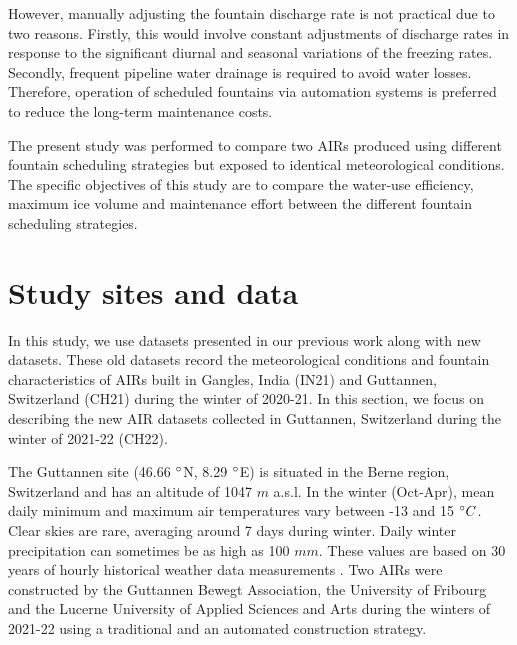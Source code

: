 \documentclass[tc, manuscript]{copernicus}
\begin{document}
However, manually adjusting the fountain discharge rate is not practical due to two reasons. Firstly, this would
involve constant adjustments of discharge rates in response to the significant diurnal and seasonal variations
of the freezing rates. Secondly, frequent pipeline water drainage is required to avoid water losses. Therefore,
operation of scheduled fountains via automation systems is preferred to reduce the long-term maintenance costs.

The present study was performed to compare two AIRs produced using different fountain scheduling strategies but
exposed to identical meteorological conditions. The specific objectives of this study are to compare the
water-use efficiency, maximum ice volume and maintenance effort between the different fountain scheduling strategies.

\section{Study sites and data}

In this study, we use datasets presented in our previous work
\citep{balasubramanianInfluenceMeteorologicalConditions2022} along with new datasets. These old datasets record
the meteorological conditions and fountain characteristics of AIRs built in Gangles, India (IN21) and Guttannen,
Switzerland (CH21) during the winter of 2020-21. In this section, we focus on describing the new AIR datasets
collected in Guttannen, Switzerland during the winter of 2021-22 (CH22).

The Guttannen site (46.66 $^{\circ}$N, 8.29 $^{\circ}$E) is situated in the Berne region, Switzerland and has an
altitude of 1047 $m$ a.s.l. In the winter (Oct-Apr), mean daily minimum and maximum air temperatures vary
between -13 and 15 $^{\circ} C$. Clear skies are rare, averaging around 7 days during winter. Daily winter
precipitation can sometimes be as high as 100 $mm$. These values are based on 30 years of hourly historical
weather data measurements \citep{meteoblueClimateGuttannen2021}. Two AIRs were constructed by the Guttannen
Bewegt Association, the University of Fribourg and the Lucerne University of Applied Sciences and Arts during
the winters of 2021-22 using a traditional and an automated construction strategy.
\end{document}
